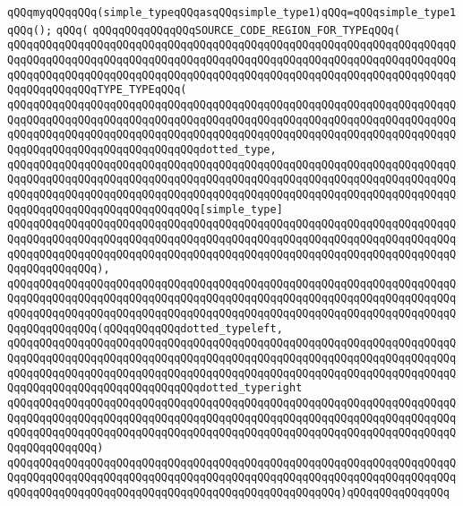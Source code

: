 \verb|qQQqmyqQQqqQQq(simple_typeqQQqasqQQqsimple_type1)qQQq=qQQqsimple_type1qQQq();|\newline
\verb|qQQq(|\newline
\verb|qQQqqQQqqQQqqQQqSOURCE_CODE_REGION_FOR_TYPEqQQq(|\newline
\verb|qQQqqQQqqQQqqQQqqQQqqQQqqQQqqQQqqQQqqQQqqQQqqQQqqQQqqQQqqQQqqQQqqQQqqQQqqQQqqQQqqQQqqQQqqQQqqQQqqQQqqQQqqQQqqQQqqQQqqQQqqQQqqQQqqQQqqQQqqQQqqQQqqQQqqQQqqQQqqQQqqQQqqQQqqQQqqQQqqQQqqQQqqQQqqQQqqQQqqQQqqQQqqQQqqQQqqQQqqQQqqQQqTYPE_TYPEqQQq(|\newline
\verb|qQQqqQQqqQQqqQQqqQQqqQQqqQQqqQQqqQQqqQQqqQQqqQQqqQQqqQQqqQQqqQQqqQQqqQQqqQQqqQQqqQQqqQQqqQQqqQQqqQQqqQQqqQQqqQQqqQQqqQQqqQQqqQQqqQQqqQQqqQQqqQQqqQQqqQQqqQQqqQQqqQQqqQQqqQQqqQQqqQQqqQQqqQQqqQQqqQQqqQQqqQQqqQQqqQQqqQQqqQQqqQQqqQQqqQQqqQQqqQQqdotted_type,|\newline
\verb|qQQqqQQqqQQqqQQqqQQqqQQqqQQqqQQqqQQqqQQqqQQqqQQqqQQqqQQqqQQqqQQqqQQqqQQqqQQqqQQqqQQqqQQqqQQqqQQqqQQqqQQqqQQqqQQqqQQqqQQqqQQqqQQqqQQqqQQqqQQqqQQqqQQqqQQqqQQqqQQqqQQqqQQqqQQqqQQqqQQqqQQqqQQqqQQqqQQqqQQqqQQqqQQqqQQqqQQqqQQqqQQqqQQqqQQqqQQqqQQq[simple_type]|\newline
\verb|qQQqqQQqqQQqqQQqqQQqqQQqqQQqqQQqqQQqqQQqqQQqqQQqqQQqqQQqqQQqqQQqqQQqqQQqqQQqqQQqqQQqqQQqqQQqqQQqqQQqqQQqqQQqqQQqqQQqqQQqqQQqqQQqqQQqqQQqqQQqqQQqqQQqqQQqqQQqqQQqqQQqqQQqqQQqqQQqqQQqqQQqqQQqqQQqqQQqqQQqqQQqqQQqqQQqqQQqqQQqqQQq),|\newline
\verb|qQQqqQQqqQQqqQQqqQQqqQQqqQQqqQQqqQQqqQQqqQQqqQQqqQQqqQQqqQQqqQQqqQQqqQQqqQQqqQQqqQQqqQQqqQQqqQQqqQQqqQQqqQQqqQQqqQQqqQQqqQQqqQQqqQQqqQQqqQQqqQQqqQQqqQQqqQQqqQQqqQQqqQQqqQQqqQQqqQQqqQQqqQQqqQQqqQQqqQQqqQQqqQQqqQQqqQQqqQQqqQQq(qQQqqQQqqQQqdotted_typeleft,|\newline
\verb|qQQqqQQqqQQqqQQqqQQqqQQqqQQqqQQqqQQqqQQqqQQqqQQqqQQqqQQqqQQqqQQqqQQqqQQqqQQqqQQqqQQqqQQqqQQqqQQqqQQqqQQqqQQqqQQqqQQqqQQqqQQqqQQqqQQqqQQqqQQqqQQqqQQqqQQqqQQqqQQqqQQqqQQqqQQqqQQqqQQqqQQqqQQqqQQqqQQqqQQqqQQqqQQqqQQqqQQqqQQqqQQqqQQqqQQqqQQqqQQqdotted_typeright|\newline
\verb|qQQqqQQqqQQqqQQqqQQqqQQqqQQqqQQqqQQqqQQqqQQqqQQqqQQqqQQqqQQqqQQqqQQqqQQqqQQqqQQqqQQqqQQqqQQqqQQqqQQqqQQqqQQqqQQqqQQqqQQqqQQqqQQqqQQqqQQqqQQqqQQqqQQqqQQqqQQqqQQqqQQqqQQqqQQqqQQqqQQqqQQqqQQqqQQqqQQqqQQqqQQqqQQqqQQqqQQqqQQqqQQq)|\newline
\verb|qQQqqQQqqQQqqQQqqQQqqQQqqQQqqQQqqQQqqQQqqQQqqQQqqQQqqQQqqQQqqQQqqQQqqQQqqQQqqQQqqQQqqQQqqQQqqQQqqQQqqQQqqQQqqQQqqQQqqQQqqQQqqQQqqQQqqQQqqQQqqQQqqQQqqQQqqQQqqQQqqQQqqQQqqQQqqQQqqQQqqQQqqQQqqQQq)qQQqqQQqqQQqqQQq|\newline
